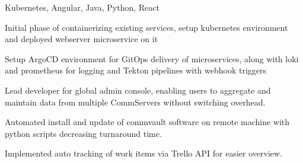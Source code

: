 \documentclass[]{font}
\begin{document}
\begin{minipage}[t]{0.66\textwidth}
Kubernetes, Angular, Java, Python, React
\vspace{\topsep}
\begin{tightemize}
\item Initial phase of containerizing existing services, setup kubernetes environment and deployed webserver microservice on it
\item Setup ArgoCD environment for GitOps delivery of microservices, along with loki and prometheus for logging and Tekton pipelines with webhook triggers
\item Lead developer for global admin console, enabling users to aggregate and maintain data from multiple CommServers without switching overhead. 
\item Automated install and update of commvault software on remote machine with python scripts decreasing turnaround time.
\item Implemented auto tracking of work items via Trello API for easier overview.
\end{tightemize}    
\sectionsep


\end{minipage}
\end{document}
